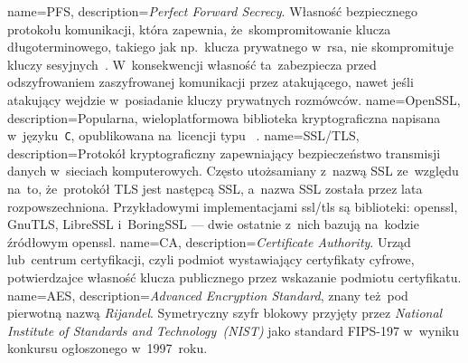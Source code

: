 {
	name={PFS},
	description={\emph{Perfect Forward Secrecy}. Własność bezpiecznego protokołu komunikacji, która zapewnia, że~skompromitowanie klucza długoterminowego, takiego jak np.~klucza prywatnego w~\gls{rsa}, nie skompromituje kluczy sesyjnych~\cite{wiki:pfs}. W~konsekwencji własność ta~zabezpiecza przed odszyfrowaniem zaszyfrowanej komunikacji przez atakującego, nawet jeśli atakujący wejdzie w~posiadanie kluczy prywatnych rozmówców.}
}
{
	name={OpenSSL},
	description={Popularna, wieloplatformowa biblioteka kryptograficzna napisana w~języku~\texttt{C}, opublikowana na~licencji typu ~\cite{openssl}.}
}
{
	name={SSL/TLS},
	description={Protokół kryptograficzny zapewniający bezpieczeństwo transmisji danych w~sieciach komputerowych. Często utożsamiany z~nazwą SSL ze~względu na~to, że~protokół TLS jest następcą SSL, a~nazwa SSL została przez lata rozpowszechniona. Przykładowymi implementacjami \gls{ssl/tls} są biblioteki: \gls{openssl}, GnuTLS, LibreSSL i~BoringSSL --- dwie ostatnie z~nich bazują na~kodzie źródłowym \gls{openssl}.}
}
{
	name={CA},
	description={\emph{Certificate Authority}. Urząd lub~centrum certyfikacji, czyli podmiot wystawiający certyfikaty cyfrowe, potwierdzajce własność klucza publicznego przez wskazanie podmiotu certyfikatu.}
}
{
	name={AES},
	description={\emph{Advanced Encryption Standard}, znany też~pod pierwotną nazwą \emph{Rijandel}. Symetryczny szyfr blokowy przyjęty przez \emph{National Institute of Standards and Technology~(NIST)} jako standard FIPS-197 w~wyniku konkursu ogłoszonego w~1997~roku.~\cite{aes-fips197}}
}
